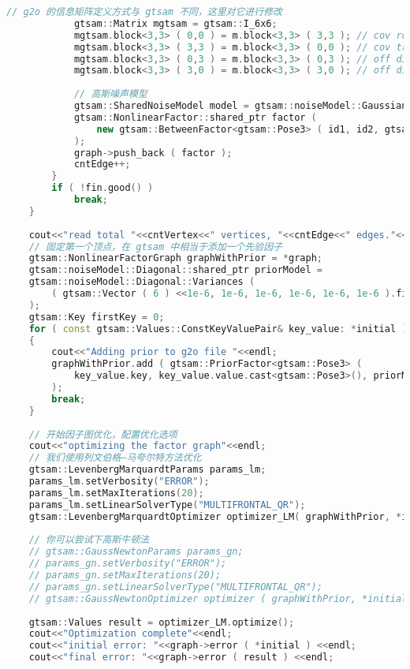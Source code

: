 \begin{lstlisting}[language=c++,caption=slambook/ch11/pose\_graph\_gtsam.cpp]
			// g2o 的信息矩阵定义方式与 gtsam 不同，这里对它进行修改
			gtsam::Matrix mgtsam = gtsam::I_6x6;
			mgtsam.block<3,3> ( 0,0 ) = m.block<3,3> ( 3,3 ); // cov rotation
			mgtsam.block<3,3> ( 3,3 ) = m.block<3,3> ( 0,0 ); // cov translation
			mgtsam.block<3,3> ( 0,3 ) = m.block<3,3> ( 0,3 ); // off diagonal
			mgtsam.block<3,3> ( 3,0 ) = m.block<3,3> ( 3,0 ); // off diagonal
			
			// 高斯噪声模型
			gtsam::SharedNoiseModel model = gtsam::noiseModel::Gaussian::Information ( mgtsam );        
			gtsam::NonlinearFactor::shared_ptr factor ( 
				new gtsam::BetweenFactor<gtsam::Pose3> ( id1, id2, gtsam::Pose3 ( R,t ), model ) // 添加一个因子
			);
			graph->push_back ( factor );
			cntEdge++;
		}
		if ( !fin.good() )
			break;
	}
	
	cout<<"read total "<<cntVertex<<" vertices, "<<cntEdge<<" edges."<<endl;
	// 固定第一个顶点，在 gtsam 中相当于添加一个先验因子 
	gtsam::NonlinearFactorGraph graphWithPrior = *graph;
	gtsam::noiseModel::Diagonal::shared_ptr priorModel = 
	gtsam::noiseModel::Diagonal::Variances (
		( gtsam::Vector ( 6 ) <<1e-6, 1e-6, 1e-6, 1e-6, 1e-6, 1e-6 ).finished() 
	);
	gtsam::Key firstKey = 0;
	for ( const gtsam::Values::ConstKeyValuePair& key_value: *initial )
	{
		cout<<"Adding prior to g2o file "<<endl;
		graphWithPrior.add ( gtsam::PriorFactor<gtsam::Pose3> ( 
			key_value.key, key_value.value.cast<gtsam::Pose3>(), priorModel ) 
		);
		break;
	}
	
	// 开始因子图优化，配置优化选项
	cout<<"optimizing the factor graph"<<endl;
	// 我们使用列文伯格—马夸尔特方法优化
	gtsam::LevenbergMarquardtParams params_lm;
	params_lm.setVerbosity("ERROR");
	params_lm.setMaxIterations(20);
	params_lm.setLinearSolverType("MULTIFRONTAL_QR");
	gtsam::LevenbergMarquardtOptimizer optimizer_LM( graphWithPrior, *initial, params_lm );
	
	// 你可以尝试下高斯牛顿法
	// gtsam::GaussNewtonParams params_gn;
	// params_gn.setVerbosity("ERROR");
	// params_gn.setMaxIterations(20);
	// params_gn.setLinearSolverType("MULTIFRONTAL_QR");
	// gtsam::GaussNewtonOptimizer optimizer ( graphWithPrior, *initial, params_gn );
	
	gtsam::Values result = optimizer_LM.optimize();
	cout<<"Optimization complete"<<endl;
	cout<<"initial error: "<<graph->error ( *initial ) <<endl;
	cout<<"final error: "<<graph->error ( result ) <<endl;
	

\end{lstlisting}
